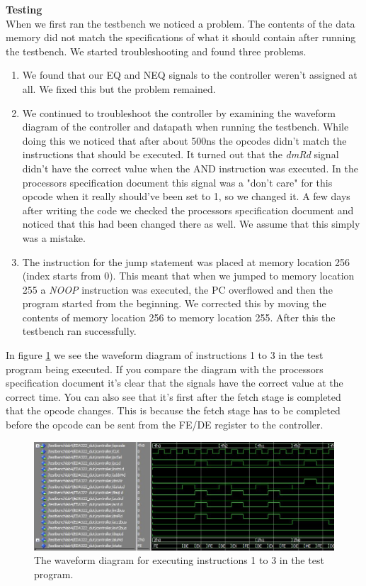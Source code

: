 \documentclass[a4paper,11pt]{article}
\begin{document}
\textbf{Testing} \\
When we first ran the testbench we noticed a problem. The contents of the data memory did not match the specifications of what it should contain after running the testbench. We started troubleshooting and found three problems.

\begin{enumerate}
  \item We found that our EQ and NEQ signals to the controller weren't assigned at all. We fixed this but the problem remained.
  \item We continued to troubleshoot the controller by examining the waveform diagram of the controller and datapath when running the testbench. While doing this we noticed that after about 500ns the opcodes didn't match the instructions that should be executed. It turned out that the \textit{dmRd} signal didn't have the correct value when the AND instruction was executed. In the processors specification document this signal was a "don't care" for this opcode when it really should've been set to 1, so we changed it. A few days after writing the code we checked the processors specification document and noticed that this had been changed there as well. We assume that this simply was a mistake. 
  \item The instruction for the jump statement was placed at memory location 256 (index starts from 0). This meant that when we jumped to memory location 255 a \textit{NOOP} instruction was executed, the PC overflowed and then the program started from the beginning. We corrected this by moving the contents of memory location 256 to memory location 255. After this the testbench ran successfully.  
\end{enumerate}

In figure \ref{fig:waves_instr} we see the waveform diagram of instructions 1 to 3 in the test program being executed. If you compare the diagram with the processors specification document it's clear that the signals have the correct value at the correct time. You can also see that it's first after the fetch stage is completed that the opcode changes. This is because the fetch stage has to be completed before the opcode can be sent from the FE/DE register to the controller. 

 \begin{figure}[h!]
  \centering
  \includegraphics[width=0.75\linewidth]{controller_waves.JPG}
  \caption{The waveform diagram for executing instructions 1 to 3 in the test program.}
  \label{fig:waves_instr}
\end{figure}
\end{document}
